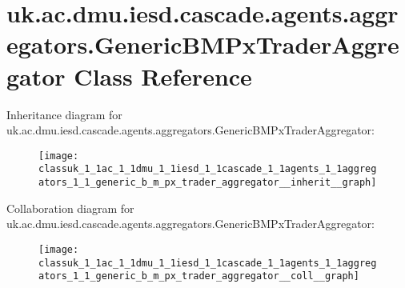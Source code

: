\hypertarget{classuk_1_1ac_1_1dmu_1_1iesd_1_1cascade_1_1agents_1_1aggregators_1_1_generic_b_m_px_trader_aggregator}{\section{uk.\-ac.\-dmu.\-iesd.\-cascade.\-agents.\-aggregators.\-Generic\-B\-M\-Px\-Trader\-Aggregator Class Reference}
\label{classuk_1_1ac_1_1dmu_1_1iesd_1_1cascade_1_1agents_1_1aggregators_1_1_generic_b_m_px_trader_aggregator}
}


Inheritance diagram for uk.\-ac.\-dmu.\-iesd.\-cascade.\-agents.\-aggregators.\-Generic\-B\-M\-Px\-Trader\-Aggregator\-:\nopagebreak
\begin{figure}[H]
\begin{center}
\leavevmode
\texttt{[image: classuk\_1\_1ac\_1\_1dmu\_1\_1iesd\_1\_1cascade\_1\_1agents\_1\_1aggregators\_1\_1\_generic\_b\_m\_px\_trader\_aggregator\_\_inherit\_\_graph]}
\end{center}
\end{figure}


Collaboration diagram for uk.\-ac.\-dmu.\-iesd.\-cascade.\-agents.\-aggregators.\-Generic\-B\-M\-Px\-Trader\-Aggregator\-:\nopagebreak
\begin{figure}[H]
\begin{center}
\leavevmode
\texttt{[image: classuk\_1\_1ac\_1\_1dmu\_1\_1iesd\_1\_1cascade\_1\_1agents\_1\_1aggregators\_1\_1\_generic\_b\_m\_px\_trader\_aggregator\_\_coll\_\_graph]}
\end{center}
\end{figure}
